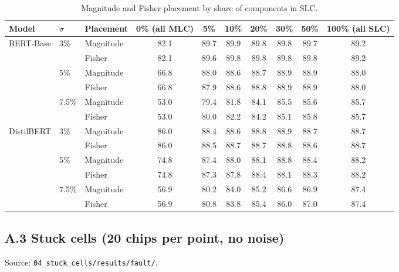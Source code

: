 \begin{table}[H]
\centering\footnotesize
\caption{Magnitude and Fisher placement by share of components in SLC.}
\begin{tabular}{@{}lllccccccc@{}}
\toprule
Model & $\sigma$ & Placement & 0\% (all MLC) & 5\% & 10\% & 20\% & 30\% & 50\% & 100\% (all SLC) \\
\midrule
\multirow{6}{*}{BERT-Base} & 3\% & Magnitude & 82.1 & 89.7 & 89.9 & 89.8 & 89.8 & 89.7 & 89.2 \\
 &  & Fisher & 82.1 & 89.6 & 89.8 & 89.8 & 89.8 & 89.8 & 89.2 \\
\cmidrule(l){2-10}
 & 5\% & Magnitude & 66.8 & 88.0 & 88.6 & 88.7 & 88.9 & 88.9 & 88.0 \\
 &  & Fisher & 66.8 & 87.9 & 88.6 & 88.8 & 88.9 & 88.9 & 88.0 \\
\cmidrule(l){2-10}
 & 7.5\% & Magnitude & 53.0 & 79.4 & 81.8 & 84.1 & 85.5 & 85.6 & 85.7 \\
 &  & Fisher & 53.0 & 80.0 & 82.2 & 84.2 & 85.1 & 85.8 & 85.7 \\
\midrule
\multirow{6}{*}{DistilBERT} & 3\% & Magnitude & 86.0 & 88.4 & 88.6 & 88.8 & 88.9 & 88.7 & 88.7 \\
 &  & Fisher & 86.0 & 88.5 & 88.7 & 88.7 & 88.8 & 88.6 & 88.7 \\
\cmidrule(l){2-10}
 & 5\% & Magnitude & 74.8 & 87.4 & 88.0 & 88.1 & 88.8 & 88.4 & 88.2 \\
 &  & Fisher & 74.8 & 87.3 & 87.8 & 88.4 & 88.1 & 88.3 & 88.2 \\
\cmidrule(l){2-10}
 & 7.5\% & Magnitude & 56.9 & 80.2 & 84.0 & 85.2 & 86.6 & 86.9 & 87.4 \\
 &  & Fisher & 56.9 & 80.8 & 83.8 & 85.4 & 86.0 & 87.0 & 87.4 \\
\bottomrule
\end{tabular}
\end{table}

\subsection*{A.3 Stuck cells (20 chips per point, no noise)}
\noindent Source: \nolinkurl{04_stuck_cells/results/fault/}.

\begin{table}[H]
\centering\footnotesize
\caption{Magnitude and Fisher placement against the share of stuck cells $p$.}
\end{table}

